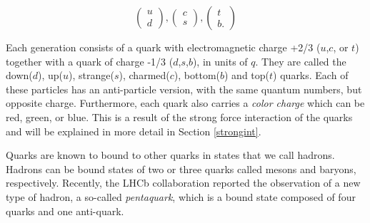 \begin{equation}
	\begin{pmatrix}
		u\\
		d
	\end{pmatrix},
\begin{pmatrix}
		c\\
		s
	\end{pmatrix},
	\begin{pmatrix}
		t\\
		b.
	\end{pmatrix}
\end{equation}

Each generation consists of a quark with electromagnetic charge +2/3 ($u$,$c$, or $t$) together with a quark of charge -1/3 ($d$,$s$,$b$), in units of $q$. They are called the down($d$), up($u$), strange($s$), charmed($c$), bottom($b$) and top($t$) quarks. Each of these particles has an anti-particle version, with the same quantum numbers, but opposite charge. Furthermore, each quark also carries a \textit{color charge} which can be red, green, or blue. This is a result of the strong force interaction of the quarks and will be explained in more detail in Section \ref{strongint}.

Quarks are known to bound to other quarks in states that we call hadrons. Hadrons can be bound states of two or three quarks called mesons and baryons, respectively. Recently, the LHCb collaboration reported the observation of a new type of hadron, a so-called \textit{pentaquark}, which is a bound state composed of four quarks and one anti-quark\cite{PhysRevLett.115.072001}.




